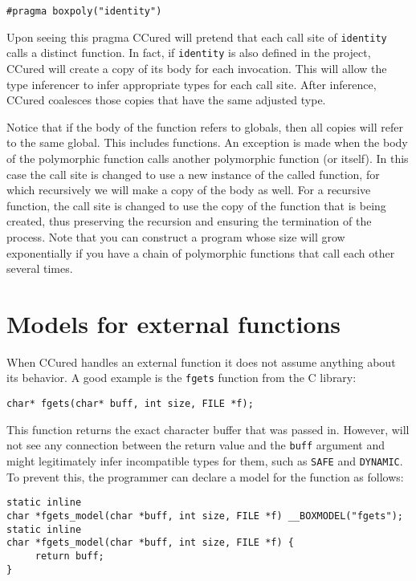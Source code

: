 \documentclass{book}
\def\t#1{{\tt #1}}
\begin{document}
\begin{verbatim}
#pragma boxpoly("identity")
\end{verbatim}
 
 Upon seeing this pragma CCured will pretend that each call site of
\t{identity} calls a distinct function. In fact, if \t{identity} is also
defined in the project, CCured will create a copy of its body for each
invocation. This will allow the type inferencer to infer appropriate types for
each call site. After inference, CCured coalesces those copies that have the
same adjusted type.

 Notice that if the body of the function refers to globals, then all copies
will refer to the same global. This includes functions. An exception is made
when the body of the polymorphic function calls another polymorphic function
(or itself). In this case the call site is changed to use a new instance of
the called function, for which recursively we will make a copy of the body as
well. For a recursive function, the call site is changed to use the copy of
the function that is being created, thus preserving the recursion and ensuring
the termination of the process. Note that you can construct a program whose
size will grow exponentially if you have a chain of polymorphic functions that
call each other several times. 

  \section{Models for external functions}

 When CCured handles an external function it does not assume anything about
its behavior. A good example is the \t{fgets} function from the C library:
\begin{verbatim}
char* fgets(char* buff, int size, FILE *f);
\end{verbatim}

 This function returns the exact character buffer that was passed in. However,
will not see any connection between the return value and the \t{buff} argument
and might legitimately infer incompatible types for them, such as \t{SAFE} and
\t{DYNAMIC}. To prevent this, the programmer can declare a model for the
function as follows:

\begin{verbatim}
static inline
char *fgets_model(char *buff, int size, FILE *f) __BOXMODEL("fgets");
static inline
char *fgets_model(char *buff, int size, FILE *f) {
     return buff;
}
\end{verbatim}
\end{document}
